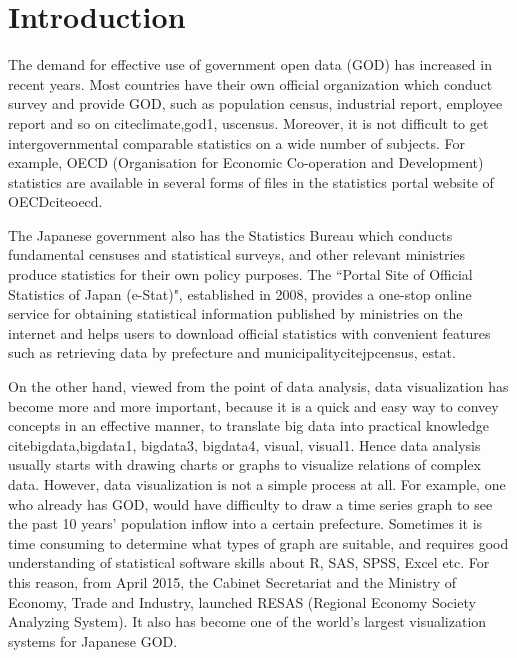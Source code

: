 \documentclass[10pt, conference, compsocconf]{IEEEtran}
\begin{document}
%
\IEEEpeerreviewmaketitle




\section{Introduction}

The demand for effective use of government open data (GOD) has increased in recent years.
Most countries have their own official organization which conduct survey and provide GOD, such as population census, industrial report, employee report and so on cite{climate,god1, uscensus}.
Moreover, it is not difficult to get intergovernmental comparable statistics on a wide number of subjects. For example, OECD (Organisation for Economic Co-operation and Development) statistics are available in several forms of files in the statistics portal website of OECDcite{oecd}. 


The Japanese government also has the Statistics Bureau which
conducts fundamental censuses and statistical surveys, and other relevant ministries produce statistics for their own policy purposes. 
The ``Portal Site of Official Statistics of Japan (e-Stat)", established in 2008, provides a one-stop online service for obtaining statistical information published by ministries on the internet and helps users to download official statistics with convenient features such as retrieving data by prefecture and municipalitycite{jpcensus, estat}.

On the other hand, viewed from the point of data analysis, data visualization has become more and more important,
because it is a quick and easy way to convey concepts in an effective manner, to translate big data into practical knowledge cite{bigdata,bigdata1, bigdata3, bigdata4, visual, visual1}. 
Hence data analysis usually starts with drawing charts or graphs to visualize relations of complex data. 
However, data visualization is not a simple process at all. 
For example, one who already has GOD, would have difficulty to draw a time series graph to see the past 10 years' population inflow into a certain prefecture. Sometimes it is time consuming to determine what types of graph are suitable, 
and requires good understanding of statistical software skills about R, SAS, SPSS, Excel etc.
For this reason, from April 2015, 
the Cabinet Secretariat and the Ministry of Economy, Trade and Industry,  
launched RESAS (Regional Economy Society Analyzing System). It also has become one of the world's largest visualization systems for Japanese GOD.
\end{document}
